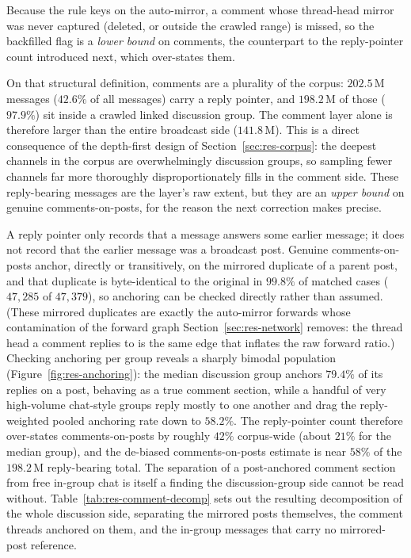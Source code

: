 Because the rule keys on the auto-mirror, a comment whose thread-head mirror was never captured (deleted, or outside the crawled range) is missed, so the backfilled flag is a \emph{lower bound} on comments, the counterpart to the reply-pointer count introduced next, which over-states them.

On that structural definition, comments are a plurality of the corpus: $202.5$\,M messages ($42.6\%$ of all messages) carry a reply pointer, and $198.2$\,M of those ($97.9\%$) sit inside a crawled linked discussion group. The comment layer alone is therefore larger than the entire broadcast side ($141.8$\,M). This is a direct consequence of the depth-first design of Section~\ref{sec:res-corpus}: the deepest channels in the corpus are overwhelmingly discussion groups, so sampling fewer channels far more thoroughly disproportionately fills in the comment side. These reply-bearing messages are the layer's raw extent, but they are an \emph{upper bound} on genuine comments-on-posts, for the reason the next correction makes precise.

A reply pointer only records that a message answers some earlier message; it does not record that the earlier message was a broadcast post. Genuine comments-on-posts anchor, directly or transitively, on the mirrored duplicate of a parent post, and that duplicate is byte-identical to the original in $99.8\%$ of matched cases ($47{,}285$ of $47{,}379$), so anchoring can be checked directly rather than assumed. (These mirrored duplicates are exactly the auto-mirror forwards whose contamination of the forward graph Section~\ref{sec:res-network} removes: the thread head a comment replies to is the same edge that inflates the raw forward ratio.) Checking anchoring per group reveals a sharply bimodal population (Figure~\ref{fig:res-anchoring}): the median discussion group anchors $79.4\%$ of its replies on a post, behaving as a true comment section, while a handful of very high-volume chat-style groups reply mostly to one another and drag the reply-weighted pooled anchoring rate down to $58.2\%$. The reply-pointer count therefore over-states comments-on-posts by roughly $42\%$ corpus-wide (about $21\%$ for the median group), and the de-biased comments-on-posts estimate is near $58\%$ of the $198.2$\,M reply-bearing total. The separation of a post-anchored comment section from free in-group chat is itself a finding the discussion-group side cannot be read without. Table~\ref{tab:res-comment-decomp} sets out the resulting decomposition of the whole discussion side, separating the mirrored posts themselves, the comment threads anchored on them, and the in-group messages that carry no mirrored-post reference.

